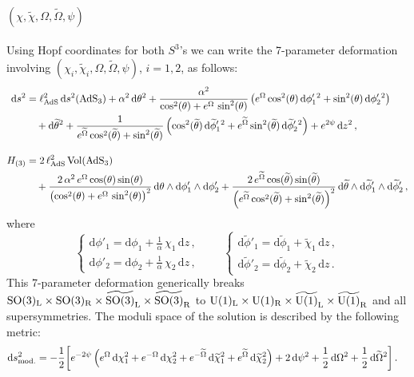 \documentclass[a4paper, 11pt]{article}
\numberwithin{equation}{section}
\newcommand{\ts}[1]{\widetilde{#1}}
\newcommand{\SO}[1]{\mathrm{SO}( #1 )}
\newcommand{\+}{\oplus}
\renewcommand{\d}{\ensuremath{\mathrm{d}}\xspace}
\begin{document}
\paragraph{\boldmath $(\chi, \ts{\chi}, \Omega, \ts{\Omega}, \psi)$}
Using Hopf coordinates for both $S^3$'s we can write the 7-parameter deformation involving $(\chi_i, \ts{\chi}_i, \Omega, \ts{\Omega}, \psi)$, $i = 1,2$, as follows:
\begin{equation} \label{eq:chiomegapsi}
	\begin{split}
		\d s^{2} &= \ell_{\rm AdS}^{2} \,\d s^{2}({\rm AdS}_{3}) + \alpha^{2}\,\d\theta^{2} +\frac{\alpha^{2}}{\cos^{2}(\theta)+e^{\Omega}\,\sin^{2}(\theta)}\left( e^{\Omega}\cos^{2}(\theta)\,\d\phi'_{1}{}^{2} + \sin^{2}(\theta)\,\d\phi'_{2}{}^{2} \right) \\
		&\quad +\d\ts{\theta}^{2} + \frac{1}{e^{\ts{\Omega}}\cos^{2}(\ts{\theta})+\sin^{2}(\ts{\theta})} \left(\cos^{2}(\ts{\theta})\,\d\ts{\phi}'_{1}{}^{2} + e^{\ts{\Omega}}\sin^{2}(\ts{\theta})\,\d\ts{\phi}'_{2}{}^{2}\right) + e^{2\psi}\,\d z^{2}\,, \\[10pt]
		H_{(3)} &= 2\,\ell_{\rm AdS}^{2}\,{\rm Vol}({\rm AdS_{3}}) \\
		&\quad + \frac{2\,\alpha^{2}\,e^{\Omega}\cos(\theta)\sin(\theta)}{\left(\cos^{2}(\theta)+e^{\Omega}\,\sin^{2}(\theta)\right)^{2}}\,\d\theta\wedge\d\phi'_{1}\wedge\d\phi'_{2}+ \frac{2\,e^{\ts{\Omega}}\cos(\ts{\theta})\sin(\ts{\theta})}{\left(e^{\ts{\Omega}}\cos^{2}(\ts{\theta})+\sin^{2}(\ts{\theta})\right)^{2}}\,\d\ts{\theta}\wedge\d\ts{\phi}'_{1}\wedge\d\ts{\phi}'_{2}\,,
	\end{split}
\end{equation}
where
\begin{equation}
	\begin{cases}
		\displaystyle \d\phi'_{1} = \d\phi_{1} + \frac{1}{\alpha}\,\chi_{1}\,\d z\,,\\[6pt]
		\displaystyle \d\phi'_{2} = \d\phi_{2} + \frac{1}{\alpha}\,\chi_{2}\,\d z\,,
	\end{cases}\qquad
	\begin{cases}
		\d\ts{\phi}'_{1} = \d\ts{\phi}_{1} + \ts{\chi}_{1}\,\d z\,,\\[6pt]
		\d\ts{\phi}'_{2} = \d\ts{\phi}_{2} + \ts{\chi}_{2}\,\d z\,.
	\end{cases}
\end{equation}
This 7-parameter deformation generically breaks $\SO{3}_{\rm L}\times\SO{3}_{\rm R}\times\ts{\SO{3}}_{\rm L}\times\ts{\SO{3}}_{\rm R}$ to ${\rm U}(1)_{\rm L}\times{\rm U}(1)_{\rm R}\times\ts{{\rm U}(1)}_{\rm L}\times\ts{{\rm U}(1)}_{\rm R}$ and all supersymmetries. The moduli space of the solution is described by the following metric:
\begin{equation} \label{eq:Zam7Param}
	\begin{aligned}
		\d s^{2}_{\rm mod.} &= -\frac{1}{2}\bigg[e^{-2\psi}\left(e^{\Omega}\,\d\chi_{1}^{2}+e^{-\Omega}\,\d\chi_{2}^{2}+e^{-\ts{\Omega}}\,\d\ts{\chi}_{1}^{2}+e^{\ts{\Omega}}\,\d\ts{\chi}_{2}^{2}\right) +2\,\d\psi^{2} + \frac{1}{2}\,\d\Omega^{2}+ \frac{1}{2}\,\d\ts{\Omega}^{2}\bigg] \,.
	\end{aligned}
\end{equation}
\end{document}

